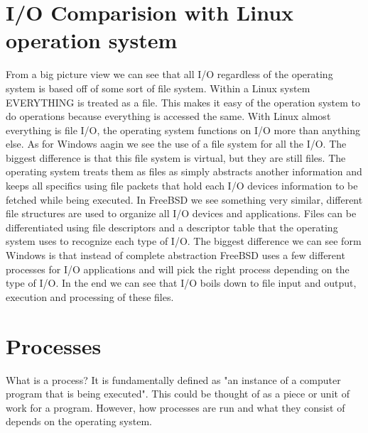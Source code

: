 \documentclass[onecolumn, draftclsnofoot,10pt, compsoc]{IEEEtran}
\begin{document}
\section{I/O Comparision with Linux operation system}
From a big picture view we can see that all I/O regardless of the operating system is based off of some sort of file system. Within a Linux system EVERYTHING is treated as a file. This makes it easy of the operation system to do operations because everything is accessed the same. With Linux almost everything is file I/O, the operating system functions on I/O more than anything else\cite{5}. As for Windows aagin we see the use of a file system for all the I/O. The biggest difference is that this file system is virtual, but they are still files. The operating system treats them as files as simply abstracts another information and keeps all specifics using file packets that hold each I/O devices information to be fetched while being executed\cite{3}. In FreeBSD we see something very similar, different file structures are used to organize all I/O devices and applications. Files can be differentiated using file descriptors and a descriptor table that the operating system uses to recognize each type of I/O. The biggest difference we can see form Windows is that instead of complete abstraction FreeBSD uses a few different processes for I/O applications and will pick the right process depending on the type of I/O\cite{2}. In the end we can see that I/O boils down to file input and output, execution and processing of these files.

\section{Processes}
What is a process? It is fundamentally defined as "an instance of a computer program that is being executed"\cite{4}. This could be thought of as a piece or unit of work for a program. However, how processes are run and what they consist of depends on the operating system.
\end{document}
